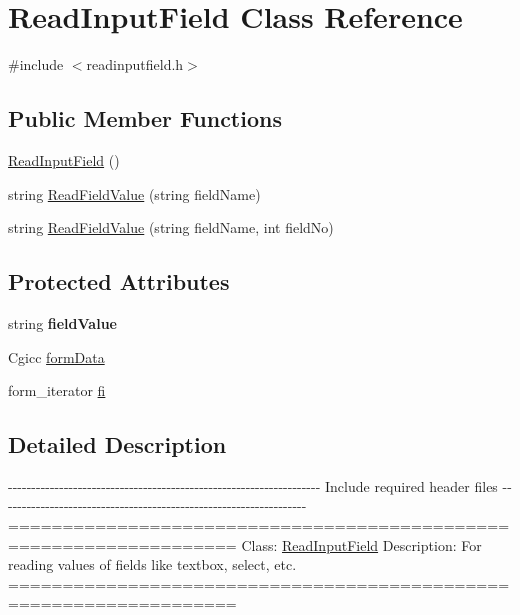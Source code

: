 \hypertarget{classReadInputField}{\section{\-Read\-Input\-Field \-Class \-Reference}
\label{d8/d37/classReadInputField}
}


{\ttfamily \#include $<$readinputfield.\-h$>$}

\subsection*{\-Public \-Member \-Functions}
\begin{DoxyCompactItemize}
\item 
\hyperlink{classReadInputField_aae743343381035c28a3a0111fc353c7f}{\-Read\-Input\-Field} ()
\item 
string \hyperlink{classReadInputField_a7f6e49b47412649644cc644927ccc682}{\-Read\-Field\-Value} (string field\-Name)
\item 
string \hyperlink{classReadInputField_accf7ceba77721a35968c69268e4e559e}{\-Read\-Field\-Value} (string field\-Name, int field\-No)
\end{DoxyCompactItemize}
\subsection*{\-Protected \-Attributes}
\begin{DoxyCompactItemize}
\item 
\hypertarget{classReadInputField_a0d95496b5fc8fb4badd4af19492182ae}{string {\bfseries field\-Value}}\label{d8/d37/classReadInputField_a0d95496b5fc8fb4badd4af19492182ae}

\item 
\-Cgicc \hyperlink{classReadInputField_a1e4ebac8979fd9b2771320d669fce5fc}{form\-Data}
\item 
form\-\_\-iterator \hyperlink{classReadInputField_ae252dc321be04c2c1afa6928ad16a45d}{fi}
\end{DoxyCompactItemize}


\subsection{\-Detailed \-Description}
-\/-\/-\/-\/-\/-\/-\/-\/-\/-\/-\/-\/-\/-\/-\/-\/-\/-\/-\/-\/-\/-\/-\/-\/-\/-\/-\/-\/-\/-\/-\/-\/-\/-\/-\/-\/-\/-\/-\/-\/-\/-\/-\/-\/-\/-\/-\/-\/-\/-\/-\/-\/-\/-\/-\/-\/-\/-\/-\/-\/-\/-\/-\/-\/-\/-\/-\/ \-Include required header files -\/-\/-\/-\/-\/-\/-\/-\/-\/-\/-\/-\/-\/-\/-\/-\/-\/-\/-\/-\/-\/-\/-\/-\/-\/-\/-\/-\/-\/-\/-\/-\/-\/-\/-\/-\/-\/-\/-\/-\/-\/-\/-\/-\/-\/-\/-\/-\/-\/-\/-\/-\/-\/-\/-\/-\/-\/-\/-\/-\/-\/-\/-\/-\/-\/-\/ =================================================================== \-Class\-: \hyperlink{classReadInputField}{\-Read\-Input\-Field} \-Description\-: \-For reading values of fields like textbox, select, etc. =================================================================== 

